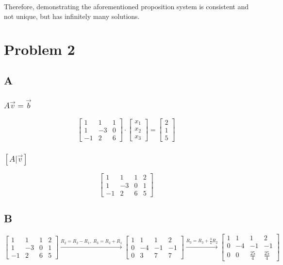 \documentclass{article}
\begin{document}
Therefore, demonstrating the aforementioned proposition system is consistent and not unique, but has infinitely many solutions.

\section*{Problem 2}

\subsection{A}
\subsubsection*{$A\vec{v}=\vec{b}$}
\[
	\begin{bmatrix}
		1  & 1  & 1 \\
		1  & -3 & 0 \\
		-1 & 2  & 6
	\end{bmatrix}
	\cdot
	\begin{bmatrix}
		x_1 \\
		x_2 \\
		x_3
	\end{bmatrix}
	=
	\begin{bmatrix}
		2 \\ 1 \\ 5
	\end{bmatrix}
\]
\subsubsection*{$[A | \vec{v} ]$}

\[
	\begin{bmatrix}
		1  & 1  & 1 & 2 \\
		1  & -3 & 0 & 1 \\
		-1 & 2  & 6 & 5
	\end{bmatrix}
\]

\subsection*{B}

\[
	\begin{bmatrix}
		1  & 1  & 1 & 2 \\
		1  & -3 & 0 & 1 \\
		-1 & 2  & 6 & 5
	\end{bmatrix}
	\xrightarrow{R_2 = R_2 - R_1,\; R_3 = R_3 + R_1}
	\begin{bmatrix}
		1 & 1  & 1  & 2  \\
		0 & -4 & -1 & -1 \\
		0 & 3  & 7  & 7
	\end{bmatrix}
	\xrightarrow{R_3 = R_3 + \frac{3}{4}R_2}
	\begin{bmatrix}
		1 & 1  & 1            & 2            \\
		0 & -4 & -1           & -1           \\
		0 & 0  & \frac{25}{4} & \frac{25}{4}
	\end{bmatrix}
\]
\end{document}
